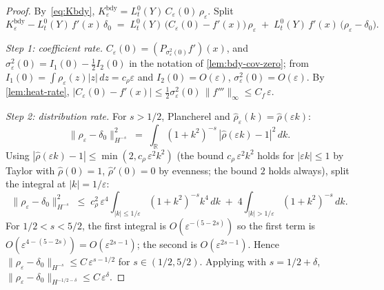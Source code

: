 \documentclass[11pt,reqno]{amsart}
\theoremstyle{plain}
\theoremstyle{definition}
\theoremstyle{remark}
\newcommand{\R}{\mathbb{R}}
\begin{document}
\begin{proof}
By~\eqref{eq:Kbdy}, $K_{\varepsilon}^{\mathrm{bdy}}=L_{t}^{0}(Y)\,C_{\varepsilon}(0)\,\rho_{\varepsilon}$.
Split
\begin{equation}\label{eq:bdy-split}
 K_{\varepsilon}^{\mathrm{bdy}}-L_{t}^{0}(Y)\,f'(x)\,\delta_{0}
 \;=\;L_{t}^{0}(Y)\,\bigl(C_{\varepsilon}(0)-f'(x)\bigr)\,\rho_{\varepsilon}
 \;+\;L_{t}^{0}(Y)\,f'(x)\,\bigl(\rho_{\varepsilon}-\delta_{0}\bigr).
\end{equation}

\emph{Step 1: coefficient rate.}
$C_{\varepsilon}(0)=(P_{\sigma_{\varepsilon}^{2}(0)}f')(x)$, and
$\sigma_{\varepsilon}^{2}(0)=I_{1}(0)-\tfrac12 I_{2}(0)$ in the
notation of \cref{lem:bdy-cov-zero}; from
$I_{1}(0)=\int\rho_{\varepsilon}(z)|z|\,dz=c_{\rho}\varepsilon$ and
$I_{2}(0)=O(\varepsilon)$, $\sigma_{\varepsilon}^{2}(0)=O(\varepsilon)$.
By \cref{lem:heat-rate}, $|C_{\varepsilon}(0)-f'(x)|\le
\tfrac12\sigma_{\varepsilon}^{2}(0)\,\|f'''\|_{\infty}\le C_{f}\,\varepsilon$.

\emph{Step 2: distribution rate.}
For $s>1/2$, Plancherel and $\hat{\rho}_{\varepsilon}(k)=\hat\rho(\varepsilon k)$:
\[
 \|\rho_{\varepsilon}-\delta_{0}\|_{H^{-s}}^{2}
 \;=\;\int_{\R}(1+k^{2})^{-s}\,|\hat\rho(\varepsilon k)-1|^{2}\,dk.
\]
Using $|\hat\rho(\varepsilon k)-1|\le\min(2,c_{\rho}\,\varepsilon^{2}k^{2})$
(the bound $c_{\rho}\,\varepsilon^{2}k^{2}$ holds for $|\varepsilon k|\le 1$
by Taylor with $\hat\rho(0)=1$, $\hat\rho'(0)=0$ by evenness; the
bound $2$ holds always), split the integral at $|k|=1/\varepsilon$:
\[
 \|\rho_{\varepsilon}-\delta_{0}\|_{H^{-s}}^{2}
 \;\le\;c_{\rho}^{2}\,\varepsilon^{4}\!\int_{|k|\le 1/\varepsilon}\!(1+k^{2})^{-s}k^{4}\,dk
 \;+\;4\!\int_{|k|>1/\varepsilon}\!(1+k^{2})^{-s}\,dk.
\]
For $1/2<s<5/2$, the first integral is $O(\varepsilon^{-(5-2s)})$ so
the first term is $O(\varepsilon^{4-(5-2s)})=O(\varepsilon^{2s-1})$;
the second is $O(\varepsilon^{2s-1})$. Hence
$\|\rho_{\varepsilon}-\delta_{0}\|_{H^{-s}}\le C\,\varepsilon^{s-1/2}$
for $s\in(1/2,5/2)$. Applying with $s=1/2+\delta$,
$\|\rho_{\varepsilon}-\delta_{0}\|_{H^{-1/2-\delta}}\le C\,\varepsilon^{\delta}$.


\end{proof}
\end{document}
